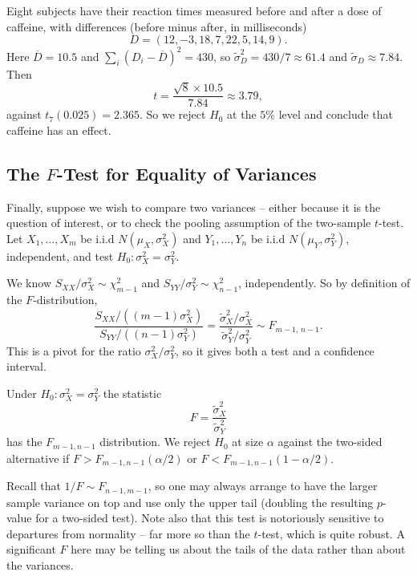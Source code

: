 \documentclass[a4paper]{scrartcl}
\begin{document}
\begin{example}
  Eight subjects have their reaction times measured before and after a dose of caffeine, with differences (before minus after, in milliseconds)
  $$
  D = (12, -3, 18, 7, 22, 5, 14, 9).
  $$
  Here $\overline{D} = 10.5$ and $\sum_i (D_i - \overline{D})^2 = 430$, so $\tilde\sigma_D^2 = 430/7 \approx 61.4$ and $\tilde\sigma_D \approx 7.84$. Then
  $$
  t = \frac{\sqrt 8 \times 10.5}{7.84} \approx 3.79,
  $$
  against $t_7(0.025) = 2.365$. So we reject $H_0$ at the $5\%$ level and conclude that caffeine has an effect.
\end{example}

\subsection{The \texorpdfstring{$F$}{F}-Test for Equality of Variances}

Finally, suppose we wish to compare two variances -- either because it is the question of interest, or to check the pooling assumption of the two-sample $t$-test. Let $X_1,\dots,X_m$ be i.i.d $N(\mu_X,\sigma_X^2)$ and $Y_1,\dots,Y_n$ be i.i.d $N(\mu_Y,\sigma_Y^2)$, independent, and test $H_0 : \sigma_X^2 = \sigma_Y^2$.

We know $S_{XX}/\sigma_X^2\sim\chi^2_{m-1}$ and $S_{YY}/\sigma_Y^2\sim\chi^2_{n-1}$, independently. So by definition of the $F$-distribution,
$$
\frac{S_{XX}/\left((m-1)\sigma_X^2\right)}{S_{YY}/\left((n-1)\sigma_Y^2\right)} = \frac{\tilde\sigma_X^2/\sigma_X^2}{\tilde\sigma_Y^2/\sigma_Y^2}\sim F_{m-1,\,n-1}.
$$
This is a pivot for the ratio $\sigma_X^2/\sigma_Y^2$, so it gives both a test and a confidence interval.

\begin{definition}
  Under $H_0 : \sigma_X^2 = \sigma_Y^2$ the statistic
  $$
  F = \frac{\tilde\sigma_X^2}{\tilde\sigma_Y^2}
  $$
  has the $F_{m-1,n-1}$ distribution. We reject $H_0$ at size $\alpha$ against the two-sided alternative if $F > F_{m-1,n-1}(\alpha/2)$ or $F < F_{m-1,n-1}(1-\alpha/2)$.
\end{definition}

\begin{remark}
  Recall that $1/F \sim F_{n-1,m-1}$, so one may always arrange to have the larger sample variance on top and use only the upper tail (doubling the resulting $p$-value for a two-sided test). Note also that this test is notoriously sensitive to departures from normality -- far more so than the $t$-test, which is quite robust. A significant $F$ here may be telling us about the tails of the data rather than about the variances.
\end{remark}
\end{document}
